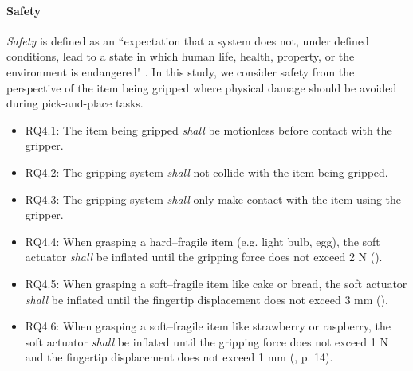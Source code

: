 \documentclass[lettersize,journal]{IEEEtran}
\begin{document}
\paragraph{Safety}\label{safety}
\emph{Safety} is defined as an ``expectation that a system does not, under defined conditions, lead to a state in which human life, health, property, or the environment is endangered" \cite{ISO24765:2017}. 
In this study, we consider safety from the perspective of the item being gripped where physical damage should be avoided during pick-and-place tasks. %
\begin{itemize}
	\item RQ4.1: The item being gripped \emph{shall} be motionless before contact with the gripper. 
	\item RQ4.2: The gripping system \emph{shall} not collide with the item being gripped. 
	\item RQ4.3: The gripping system \emph{shall} only make contact with the item using the gripper.
	\item RQ4.4: When grasping a hard–fragile item (e.g. light bulb, egg), the soft actuator \emph{shall} be inflated until the gripping force does not exceed 2 N (\cite{Cheng2021}).
	\item RQ4.5: When grasping a soft–fragile item like cake or bread, the soft actuator \emph{shall} be inflated until the fingertip displacement does not exceed 3 mm (\cite{Cheng2021}).
	\item RQ4.6: When grasping a soft–fragile item like strawberry or raspberry, the soft actuator \emph{shall} be inflated until the gripping force does not exceed 1 N and the fingertip displacement does not exceed 1 mm (\cite{Cheng2021}, p. 14).
\end{itemize}
\end{document}
